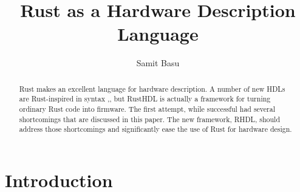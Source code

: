 \documentclass[sigplan,screen,sigconf]{acmart}
\author{Samit Basu}
\affiliation{
  basu.samit@gmail.com
  \country{Fremont CA, USA}
}
\begin{document}
\title{Rust as a Hardware Description Language}

\begin{abstract}
Rust \cite{b9} makes an excellent language for hardware description.  A number of new HDLs are 
Rust-inspired in syntax \cite{b1},\cite{b4},
but RustHDL\cite{b6} is actually a framework for turning ordinary Rust code into firmware.  The first attempt,
while successful had several shortcomings that are discussed in this paper.  The new framework, RHDL\cite{b10},
should address those shortcomings and significantly ease the use of Rust for hardware design.
\end{abstract}

\maketitle

\section{Introduction}
\end{document}

